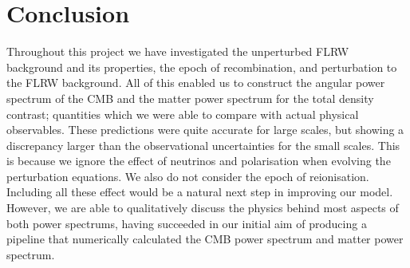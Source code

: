 \section{Conclusion}\label{sec:conclusion}

Throughout this project we have investigated the unperturbed FLRW background and its properties, the epoch of recombination, and perturbation to the FLRW background. All of this enabled us to construct the angular power spectrum of the CMB and the matter power spectrum for the total density contrast; quantities which we were able to compare with actual physical observables. These predictions were quite accurate for large scales, but showing a discrepancy larger than the observational uncertainties for the small scales. This is because we ignore the effect of neutrinos and polarisation when evolving the perturbation equations. We also do not consider the epoch of reionisation. Including all these effect would be a natural next step in improving our model. However, we are able to qualitatively discuss the physics behind most aspects of both power spectrums, having succeeded in our initial aim of producing a pipeline that numerically calculated the CMB power spectrum and matter power spectrum. 
